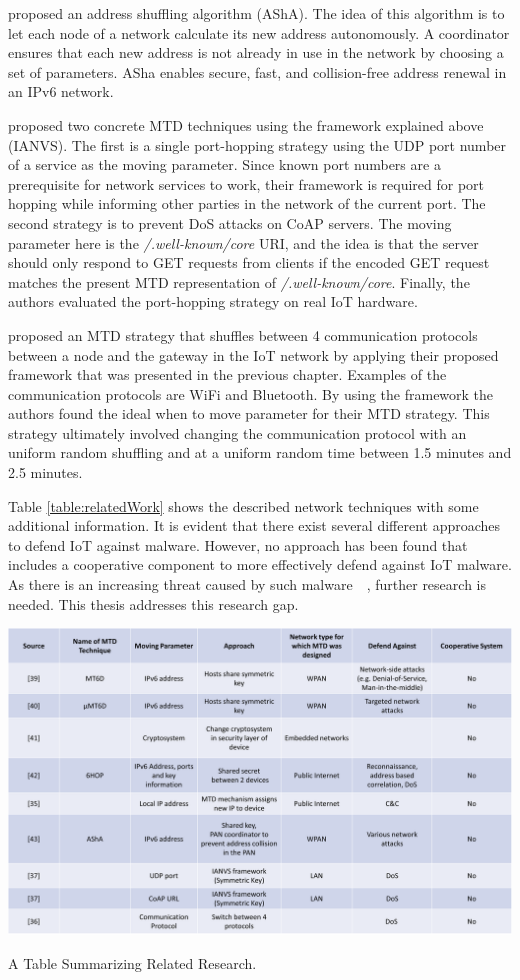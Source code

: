 \cite{article:asha} proposed an address shuffling algorithm (AShA). The idea of this algorithm is to let each node of a network calculate its new address autonomously. A coordinator ensures that each new address is not already in use in the network by choosing a set of parameters. ASha enables secure, fast, and collision-free address renewal in an IPv6 network.  





\cite{NavasDefenseFramework} proposed two concrete MTD techniques using the framework explained above (IANVS). The first is a single port-hopping strategy using the UDP port number of a service as the moving parameter. Since known port numbers are a prerequisite for network services to work, their framework is required for port hopping while informing other parties in the network of the current port. The second strategy is to prevent DoS attacks on CoAP servers. The moving parameter here is the \textit{/.well-known/core} URI, and the idea is that the server should only respond to GET requests from clients if the encoded GET request matches the present MTD representation of \textit{/.well-known/core}. Finally, the authors evaluated the port-hopping strategy on real IoT hardware. 


\cite{article:mercado-velazquez} proposed an MTD strategy that shuffles between 4 communication protocols between a node and the gateway in the IoT network by applying their proposed framework that was presented in the previous chapter. Examples of the communication protocols are WiFi and Bluetooth. By using the framework the authors found the ideal when to move parameter for their MTD strategy. This strategy ultimately involved changing the communication protocol with an uniform random shuffling and at a uniform random time between 1.5 minutes and 2.5 minutes.


Table \ref{table:relatedWork} shows the described network techniques with some additional information. It is evident that there exist several different approaches to defend IoT against malware. However, no approach has been found that includes a cooperative component to more effectively defend against IoT malware. As there is an increasing threat caused by such malware~\cite{website:KasperskyAMalwareStory}~\cite{website:trendmicroTheFuture}, further research is needed. This thesis addresses this research gap.  



 \begin{table}
\includegraphics[scale=0.55]{assets/relatedWork.png}
\centering
\caption{A Table Summarizing Related Research.}
    \label{table:relatedWork}
\end{table}
